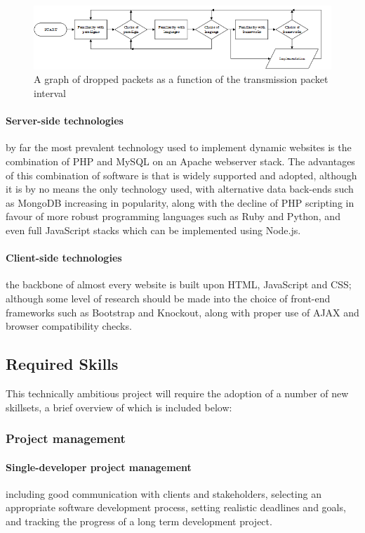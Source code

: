 \documentclass[12pt,a4paper]{article}
\begin{document}
\begin{figure}[H]
\centering
\includegraphics{assets/flow-tech-choices.png}
\caption{A graph of dropped packets as a function of the transmission packet
  interval}
\label{fig:graph-interval-dropped}
\end{figure}

\paragraph{Server-side technologies} by far the most prevalent technology used
to implement dynamic websites is the combination of PHP and MySQL on an Apache
webserver stack. The advantages of this combination of software is that is
widely supported and adopted, although it is by no means the only technology
used, with alternative data back-ends such as MongoDB increasing in popularity,
along with the decline of PHP scripting in favour of more robust programming
languages such as Ruby and Python, and even full JavaScript stacks which can be
implemented using Node.js.
\paragraph{Client-side technologies} the backbone of almost every website is
built upon HTML, JavaScript and CSS; although some level of research should be
made into the choice of front-end frameworks such as Bootstrap and Knockout,
along with proper use of AJAX and browser compatibility checks.

\subsection{Required Skills}
This technically ambitious project will require the adoption of a number of new
skillsets, a brief overview of which is included below:

\subsubsection{Project management}
\paragraph{Single-developer project management} including good communication
with clients and stakeholders, selecting an appropriate software development
process, setting realistic deadlines and goals, and tracking the progress of a
long term development project.
\end{document}
